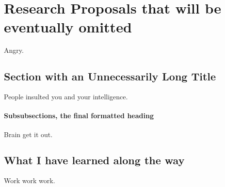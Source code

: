 \chapter{Research Proposals that will be eventually omitted}

Angry. 

\section[What my Optics Studies have been]{Section with an Unnecessarily Long Title}

People insulted you and your intelligence. 

\subsubsection{Subsubsections, the final formatted heading}

Brain get it out.

\section{What I have learned along the way}
Work work work.